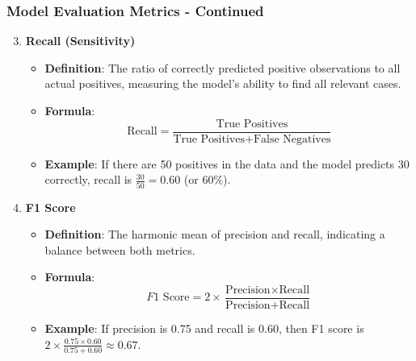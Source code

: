 \documentclass{beamer}
\begin{document}
\begin{frame}[fragile]
    \frametitle{Model Evaluation Metrics - Continued}
    \begin{enumerate}
        \setcounter{enumi}{2} %
        
        \item \textbf{Recall (Sensitivity)}
        \begin{itemize}
            \item \textbf{Definition}: The ratio of correctly predicted positive observations to all actual positives, measuring the model's ability to find all relevant cases.
            \item \textbf{Formula}: 
            \begin{equation}
            \text{Recall} = \frac{\text{True Positives}}{\text{True Positives} + \text{False Negatives}}
            \end{equation}
            \item \textbf{Example}: If there are 50 positives in the data and the model predicts 30 correctly, recall is \( \frac{30}{50} = 0.60 \) (or 60\%).
        \end{itemize}

        \item \textbf{F1 Score}
        \begin{itemize}
            \item \textbf{Definition}: The harmonic mean of precision and recall, indicating a balance between both metrics.
            \item \textbf{Formula}: 
            \begin{equation}
            F1 \text{ Score} = 2 \times \frac{\text{Precision} \times \text{Recall}}{\text{Precision} + \text{Recall}}
            \end{equation}
            \item \textbf{Example}: If precision is 0.75 and recall is 0.60, then F1 score is \( 2 \times \frac{0.75 \times 0.60}{0.75 + 0.60} \approx 0.67 \).
        \end{itemize}
    \end{enumerate}
\end{frame}
\end{document}

